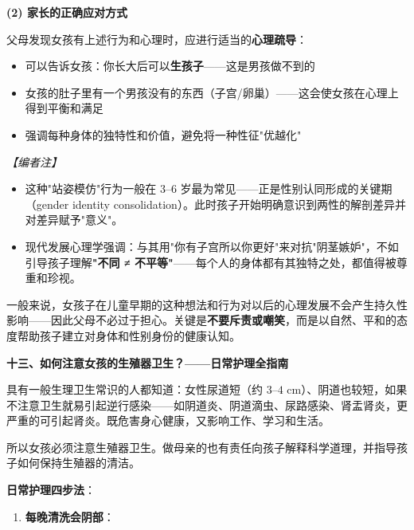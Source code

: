 \begin{enumerate}
\vspace{0.3em}
\noindent\textbf{(2) 家长的正确应对方式}

父母发现女孩有上述行为和心理时，应进行适当的\textbf{心理疏导}：

\begin{itemize}
	\item 可以告诉女孩：你长大后可以\textbf{生孩子}——这是男孩做不到的
	\item 女孩的肚子里有一个男孩没有的东西（子宫/卵巢）——这会使女孩在心理上得到平衡和满足
	\item 强调每种身体的独特性和价值，避免将一种性征"优越化"
\end{itemize}

\vspace{0.3em}
\noindent\textit{【编者注】}
\begin{itemize}
	\item 这种"站姿模仿"行为一般在 $3$--$6$ 岁最为常见——正是性别认同形成的关键期（gender identity consolidation）。此时孩子开始明确意识到两性的解剖差异并对差异赋予"意义"。
	\item 现代发展心理学强调：与其用"你有子宫所以你更好"来对抗"阴茎嫉妒"，不如引导孩子理解\textbf{"不同 ≠ 不平等"}——每个人的身体都有其独特之处，都值得被尊重和珍视。
\end{itemize}

\begin{tcolorbox}[colback=pink!5!white,colframe=red!50!black,title=贴心小叮咛]
一般来说，女孩子在儿童早期的这种想法和行为对以后的心理发展不会产生持久性影响——因此父母不必过于担心。关键是\textbf{不要斥责或嘲笑}，而是以自然、平和的态度帮助孩子建立对身体和性别身份的健康认知。
\end{tcolorbox}

\vspace{0.8em}
\noindent\textbf{十三、如何注意女孩的生殖器卫生？——日常护理全指南}

具有一般生理卫生常识的人都知道：女性尿道短（约 $3$--$4$ cm）、阴道也较短，如果不注意卫生就易引起逆行感染——如阴道炎、阴道滴虫、尿路感染、肾盂肾炎，更严重的可引起肾炎。既危害身心健康，又影响工作、学习和生活。

所以女孩必须注意生殖器卫生。做母亲的也有责任向孩子解释科学道理，并指导孩子如何保持生殖器的清洁。

\vspace{0.5em}
\noindent\textbf{日常护理四步法}：

\begin{enumerate}
	\item \textbf{每晚清洗会阴部}：


\end{enumerate}
\end{enumerate}
